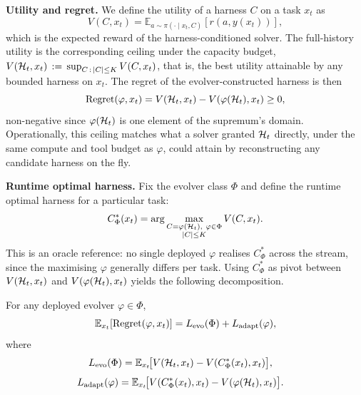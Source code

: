 \noindent\textbf{Utility and regret.}
We define the utility of a harness $C$ on a task $x_t$ as
\begin{equation}
\label{eq:utility}
V(C, x_t) = \mathbb{E}_{a \sim \pi(\cdot \mid x_t, C)}[r(a, y(x_t))],
\end{equation}
which is the expected reward of the harness-conditioned solver. The full-history utility is the corresponding ceiling under the capacity budget,
$V(\mathcal{H}_t, x_t) \,:=\, \sup_{\substack{C \,:\, |C| \leq K}} V(C, x_t)$,
that is, the best utility attainable by any bounded harness on $x_t$. The regret of the evolver-constructed harness is then
\begin{equation}
\label{eq:regret}
\text{Regret}(\varphi, x_t) = V(\mathcal{H}_t, x_t) - V(\varphi(\mathcal{H}_t), x_t) \geq 0,
\end{equation}
non-negative since $\varphi(\mathcal{H}_t)$ is one element of the supremum's domain. Operationally, this ceiling matches what a solver granted $\mathcal{H}_t$ directly, under the same compute and tool budget as $\varphi$, could attain by reconstructing any candidate harness on the fly.

\noindent\textbf{Runtime optimal harness.}
Fix the evolver class $\Phi$ and define the runtime optimal harness for a particular task:
\begin{equation}
\label{eq:cstar}
C^*_\Phi(x_t) = \arg\max_{\substack{C = \varphi(\mathcal{H}_t),\ \varphi \in \Phi \\ |C| \leq K}} V(C, x_t).
\end{equation}
This is an oracle reference: no single deployed $\varphi$ realises $C^*_\Phi$ across the stream, since the maximising $\varphi$ generally differs per task. Using $C^*_\Phi$ as pivot between $V(\mathcal{H}_t, x_t)$ and $V(\varphi(\mathcal{H}_t), x_t)$ yields the following decomposition.

\begin{proposition}
\label{prop:decomp}
For any deployed evolver $\varphi \in \Phi$,
\begin{equation}
\label{eq:decomp}
\mathbb{E}_{x_t}[\text{Regret}(\varphi, x_t)] = L_{\text{evo}}(\Phi) + L_{\text{adapt}}(\varphi),
\end{equation}
where
\begin{align}
\label{eq:losses}
L_{\text{evo}}(\Phi) &= \mathbb{E}_{x_t}\!\bigl[V(\mathcal{H}_t, x_t) - V(C^*_\Phi(x_t), x_t)\bigr],
\end{align}
\begin{align}
L_{\text{adapt}}(\varphi)  &= \mathbb{E}_{x_t}\!\bigl[V(C^*_\Phi(x_t), x_t) - V(\varphi(\mathcal{H}_t), x_t)\bigr].
\end{align}
\end{proposition}

